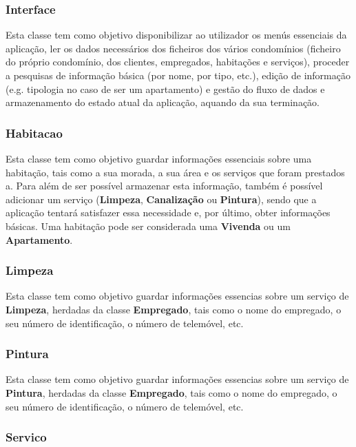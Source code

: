 \documentclass[a4paper]{article}
\begin{document}
\subsubsection{Interface}

Esta classe tem como objetivo disponibilizar ao utilizador os menús essenciais da aplicação, ler os dados necessários dos ficheiros dos vários condomínios (ficheiro do próprio condomínio, dos clientes, empregados, habitações e serviços), proceder a pesquisas de informação básica (por nome, por tipo, etc.), edição de informação (e.g. tipologia no caso de ser um apartamento) e gestão do fluxo de dados e armazenamento do estado atual da aplicação, aquando da sua terminação.

\subsubsection{Habitacao}

Esta classe tem como objetivo guardar informações essenciais sobre uma habitação, tais como a sua morada, a sua área e os serviços que foram prestados a. Para além de ser possível armazenar esta informação, também é possível adicionar um serviço (\textbf{Limpeza}, \textbf{Canalização} ou \textbf{Pintura}), sendo que a aplicação tentará satisfazer essa necessidade e, por último, obter informações básicas. Uma habitação pode ser considerada uma \textbf{Vivenda} ou um \textbf{Apartamento}.

\subsubsection{Limpeza}

Esta classe tem como objetivo guardar informações essencias sobre um serviço de \textbf{Limpeza}, herdadas da classe \textbf{Empregado}, tais como o nome do empregado, o seu número de identificação, o número de telemóvel, etc.

\subsubsection{Pintura}

Esta classe tem como objetivo guardar informações essencias sobre um serviço de \textbf{Pintura}, herdadas da classe \textbf{Empregado}, tais como o nome do empregado, o seu número de identificação, o número de telemóvel, etc.

\subsubsection{Servico}
\end{document}
